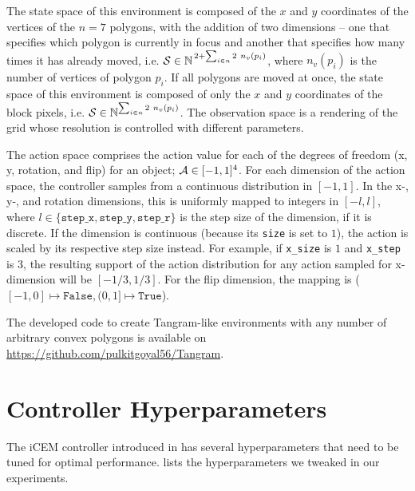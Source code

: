 The state space of this environment is composed of the \(x\) and \(y\) coordinates of the vertices of the \(n = 7\) polygons, with the addition of two dimensions -- one that specifies which polygon is currently in focus and another that specifies how many times it has already moved, i.e. \(\mathcal{S} \in \mathbb{N}^{\,2 + \sum_{i \in n} 2\ n_v(p_i)}\), where \(n_v(p_i)\) is the number of vertices of polygon \(p_i\).
If all polygons are moved at once, the state space of this environment is composed of only the \(x\) and \(y\) coordinates of the block pixels, i.e. \(\mathcal{S} \in \mathbb{N}^{\sum_{i \in n} 2\ n_v(p_i)}\).
The observation space is a rendering of the grid whose resolution is controlled with different parameters.

The action space comprises the action value for each of the degrees of freedom (x, y, rotation, and flip) for an object; \(\mathcal{A} \in [-1, 1]^4\).
For each dimension of the action space, the controller samples from a continuous distribution in \([-1, 1]\).
In the x-, y-, and rotation dimensions, this is uniformly mapped to integers in \([-l, l]\), where \(l \in \{\texttt{step\_x}, \texttt{step\_y}, \texttt{step\_r}\}\) is the step size of the dimension, if it is discrete.
If the dimension is continuous (because its \texttt{size} is set to \(1\)), the action is scaled by its respective step size instead.
For example, if \texttt{x\_size} is \(1\) and \texttt{x\_step} is \(3\), the resulting support of the action distribution for any action sampled for x-dimension will be \([-1/3, 1/3]\).
For the flip dimension, the mapping is (\([-1, 0] \mapsto \texttt{False}, (0, 1] \mapsto \texttt{True}\)).

The developed code to create Tangram-like environments with any number of arbitrary convex polygons is available on \url{https://github.com/pulkitgoyal56/Tangram}.


\chapter{Controller Hyperparameters}
\label{sec:icem-details}
The iCEM controller introduced in  has several hyperparameters that need to be tuned for optimal performance.
 lists the hyperparameters we tweaked in our experiments.

